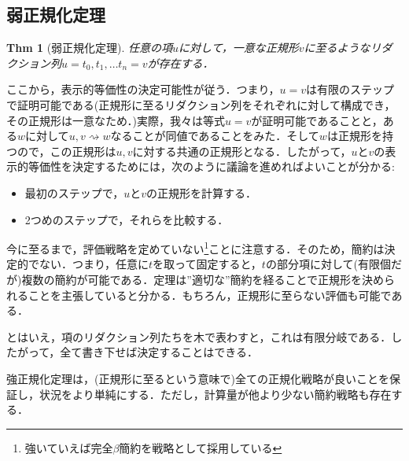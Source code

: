 \documentclass[a4paper,10pt,platex, dvipdfmx]{jsarticle}
\newtheorem{thm}{Thm}
\begin{document}
\subsection{弱正規化定理}
\begin{thm}[弱正規化定理]
任意の項$u$に対して，一意な正規形$v$に至るようなリダクション列$u = t_{0},t_{1},\ldots t_{n} = v$が存在する．
\end{thm}
ここから，表示的等価性の決定可能性が従う．つまり，$u = v$は有限のステップで証明可能である(正規形に至るリダクション列をそれぞれに対して構成でき，その正規形は一意なため．)実際，我々は等式$u = v$が証明可能であることと，ある$w$に対して$u, v \rightsquigarrow w$なることが同値であることをみた．そして$w$は正規形を持つので，この正規形は$u, v$に対する共通の正規形となる．したがって，$u$と$v$の表示的等価性を決定するためには，次のように議論を進めればよいことが分かる:
\begin{itemize}
\item 最初のステップで，$u$と$v$の正規形を計算する．
\item 2つめのステップで，それらを比較する．
\end{itemize}

今に至るまで，評価戦略を定めていない\footnote{強いていえば完全$\beta$簡約を戦略として採用している}ことに注意する．そのため，簡約は決定的でない．つまり，任意に$t$を取って固定すると，$t$の部分項に対して(有限個だが)複数の簡約が可能である．定理は''適切な''簡約を経ることで正規形を決められることを主張していると分かる．もちろん，正規形に至らない評価も可能である．

とはいえ，項のリダクション列たちを木で表わすと，これは有限分岐である．したがって，全て書き下せば決定することはできる．

強正規化定理は，(正規形に至るという意味で)全ての正規化戦略が良いことを保証し，状況をより単純にする．ただし，計算量が他より少ない簡約戦略も存在する．
\end{document}

